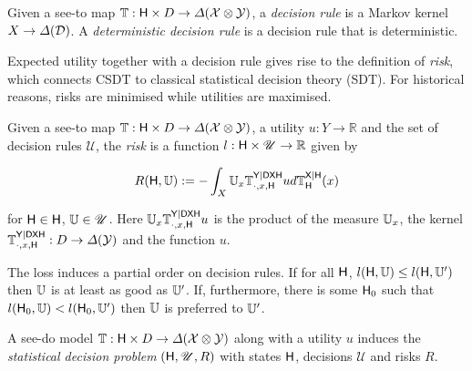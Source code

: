 \begin{definition}
Given a see-to map $\mathbb{T}:\mathsf{H}\times D\to \Delta(\mathcal{X}\otimes\mathcal{Y})$, a \emph{decision rule} is a Markov kernel $X\to \Delta(\mathcal{D})$. A \emph{deterministic decision rule} is a decision rule that is deterministic.

\end{definition}

Expected utility together with a decision rule gives rise to the definition of \emph{risk}, which connects CSDT to classical statistical decision theory (SDT). For historical reasons, risks are minimised while utilities are maximised.

\begin{definition}[Risk]
Given a see-to map $\mathbb{T}:\mathsf{H}\times D\to \Delta(\mathcal{X}\otimes\mathcal{Y})$, a utility $u:Y\to \mathbb{R}$ and the set of decision rules $\mathscr{U}$, the \emph{risk} is a function $l:\mathsf{H}\times \mathscr{U}\to \mathbb{R}$ given by

\begin{align}
    R(\mathsf{H},\mathbb{U}) := - \int_X  \mathbb{U}_x \mathbb{T}^{\mathsf{Y}|\mathsf{D}\mathsf{X}\mathsf{H}}_{\cdot,x,\mathsf{H}} u d\mathbb{T}^{\mathsf{X}|\mathsf{H}}_{\mathsf{H}}(x)
\end{align}

for $\mathsf{H}\in \mathsf{H}$, $\mathbb{U}\in \mathscr{U}$. Here $\mathbb{U}_x \mathbb{T}^{\mathsf{Y}|\mathsf{D}\mathsf{X}\mathsf{H}}_{\cdot,x,\mathsf{H}} u$ is the product of the measure $\mathbb{U}_x$, the kernel $\mathbb{T}^{\mathsf{Y}|\mathsf{D}\mathsf{X}\mathsf{H}}_{\cdot,x,\mathsf{H}}:D\to \Delta(\mathcal{Y})$ and the function $u$.
\end{definition}

The loss induces a partial order on decision rules. If for all $\mathsf{H}$, $l(\mathsf{H},\mathbb{U})\leq l(\mathsf{H},\mathbb{U}')$ then $\mathbb{U}$ is at least as good as $\mathbb{U}'$. If, furthermore, there is some $\mathsf{H}_0$ such that $l(\mathsf{H}_0,\mathbb{U})<l(\mathsf{H}_0,\mathbb{U}')$ then $\mathbb{U}$ is preferred to $\mathbb{U}'$.

\begin{definition}
A see-do model $\mathbb{T}:\mathsf{H}\times D\to \Delta(\mathcal{X}\otimes\mathcal{Y})$ along with a utility $u$ induces the \emph{statistical decision problem} $(\mathsf{H},\mathscr{U},R)$ with states $\mathsf{H}$, decisions $\mathscr{U}$ and risks $R$.


\end{definition}


